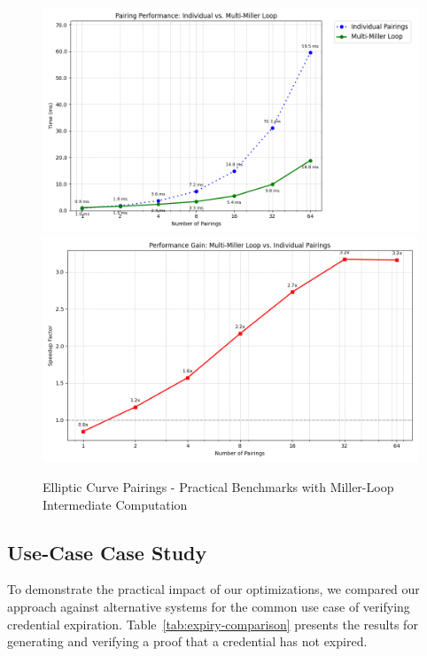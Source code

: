 \begin{figure}
    \centering
    \includegraphics[width=0.75\linewidth]{pairing_comparison.png}
        \includegraphics[width=0.75\linewidth]{pairing_comparison2.png}
    \caption{Elliptic Curve Pairings - Practical Benchmarks with Miller-Loop Intermediate Computation}
    \label{fig:enter-label}
\end{figure}




\subsection{Use-Case Case Study}

To demonstrate the practical impact of our optimizations, we compared our approach against alternative systems for the common use case of verifying credential expiration. Table~\ref{tab:expiry-comparison} presents the results for generating and verifying a proof that a credential has not expired.



